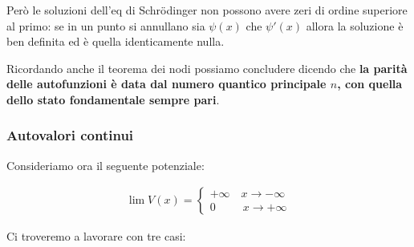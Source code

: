 Però le soluzioni dell'eq di Schrödinger non possono avere zeri di ordine superiore al primo: se in un punto si annullano sia $\psi(x)$ che $\psi'(x)$ allora la soluzione è ben definita ed è quella identicamente nulla.

Ricordando anche il teorema dei nodi possiamo concludere dicendo che \textbf{la parità delle autofunzioni è data dal numero quantico principale $n$, con quella dello stato fondamentale sempre pari}.

\newpage

\subsubsection{Autovalori continui}

Consideriamo ora il seguente potenziale:

\begin{align}
\lim V(x)=
\left\{
\begin{array}{cc}
+\infty \quad x\rightarrow-\infty \\
0 \;\,\qquad x\rightarrow +\infty
\end{array}
\right.
\end{align}

	\begin{figure}[!htb]
\end{figure}

Ci troveremo a lavorare con tre casi:

	\begin{figure}[!htb]
\end{figure}

